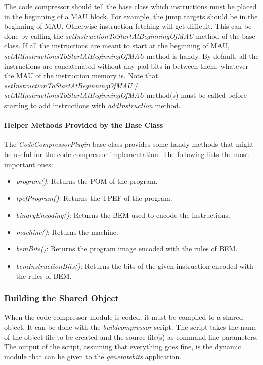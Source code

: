 \documentclass[a4paper,twoside]{tceusermanual}
\begin{document}
The code compressor should tell the base class which instructions must be
placed in the beginning of a MAU block. For example, the jump targets
should be in the beginning of MAU. Otherwise instruction fetching will
get difficult. This can be done by calling the
\emph{setInstructionToStartAtBeginningOfMAU} method of the base class. If all
the instructions are meant to start at the beginning of MAU,
\emph{setAllInstructionsToStartAtBeginningOfMAU} method is handy. By default,
all the instructions are concatenated without any pad bits in between
them, whatever the MAU of the instruction memory is. Note
that \emph{setInstructionToStartAtBeginningOfMAU} /
\emph{setAllInstructionsToStartAtBeginningOfMAU} method(s) must be called
before starting to add instructions with \emph{addInstruction} method.

\paragraph{Helper Methods Provided by the Base Class}

The \emph{CodeCompressorPlugin} base class provides some handy methods
that might be useful for the code compressor implementation. The
following lists the most important ones: 

\begin{itemize}
\item \emph{program()}: Returns the POM of the program.
\item \emph{tpefProgram()}: Returns the TPEF of the program.
\item \emph{binaryEncoding()}: Returns the BEM used to encode the instructions.
\item \emph{machine()}: Returns the machine.
\item \emph{bemBits()}: Returns the program image encoded with the rules of BEM.
\item \emph{bemInstructionBits()}: Returns the bits of the given instruction
encoded with the rules of BEM.
\end{itemize}


\subsubsection{Building the Shared Object}

When the code compressor module is coded, it must be compiled to a
shared object. It can be done with the \emph{buildcompressor}
script. The script takes the name of the object file to be created and
the source file(s) as command line parameters. The output of the
script, assuming that everything goes fine, is the dynamic module that
can be given to the \emph{generatebits} application.
\end{document}
